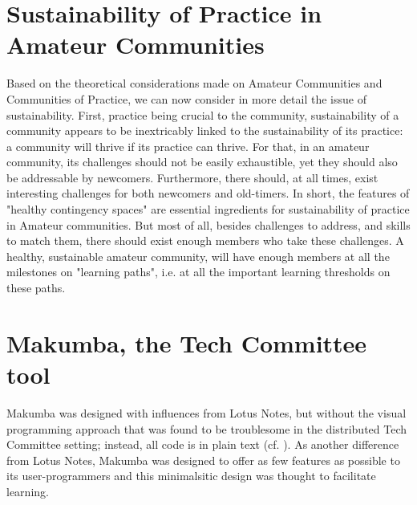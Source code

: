 \documentclass{sig-alt-release2}
\begin{document}
\section{Sustainability of Practice in Amateur Communities}\label{sec:sust}
Based on the theoretical considerations made on Amateur Communities and Communities of Practice, we can now consider in more detail the issue of sustainability. First, practice being crucial to the community, sustainability of a community appears to be inextricably linked to the sustainability of its practice: a community will thrive if its practice can thrive. For that, in an amateur community, its challenges should not be easily exhaustible, yet they should also be addressable by newcomers. Furthermore, there should, at all times, exist interesting challenges for both newcomers and old-timers. In short, the features of "healthy contingency spaces" are essential ingredients for sustainability of practice in Amateur communities. But most of all, besides challenges to address, and skills to match them, there should exist enough members who take these challenges. A healthy, sustainable amateur community, will have enough members at all the milestones on "learning paths", i.e. at all the important learning thresholds on these paths.

\section{Makumba, the Tech Committee tool}\label{sec:makumba}

Makumba was designed with influences from Lotus Notes, but without the visual programming approach that was found to be troublesome in the distributed Tech Committee setting; instead, all code is in plain text (cf. \cite{yamauchi00}). As another difference from Lotus Notes, Makumba was designed to offer as few features as possible to its user-programmers and this minimalsitic design was thought to facilitate learning. 
\end{document}
